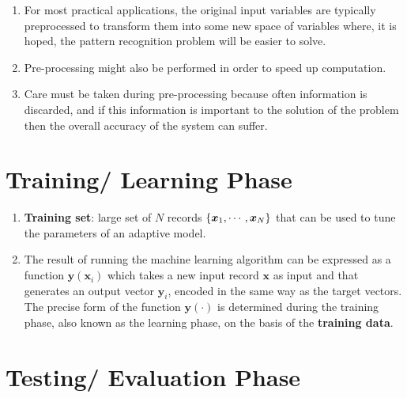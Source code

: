 \begin{enumerate}
    \item For most practical applications, the original input variables are typically preprocessed to transform them into some new space of variables where, it is hoped, the pattern recognition problem will be easier to solve.
    \hfill \cite{ml/book/Pattern-Recognition-And-Machine-Learning/Christopher-M-Bishop}

    \item Pre-processing might also be performed in order to speed up computation.
    \hfill \cite{ml/book/Pattern-Recognition-And-Machine-Learning/Christopher-M-Bishop}

    \item Care must be taken during pre-processing because often information is discarded, and if this information is important to the solution of the problem then the overall accuracy of the system can suffer.
    \hfill \cite{ml/book/Pattern-Recognition-And-Machine-Learning/Christopher-M-Bishop}
\end{enumerate}




\section{Training/ Learning Phase}

\begin{enumerate}
    \item \textbf{Training set}: large set of $N$ records $\left\{\bm{x}_1, \cdots , \bm{x}_N \right\}$ that can be used to tune the parameters of an adaptive model. 
    \hfill \cite{ml/book/Pattern-Recognition-And-Machine-Learning/Christopher-M-Bishop}

    \item The result of running the machine learning algorithm can be expressed as a function $\bm{y}(\bm{x}_i)$ which takes a new input record $\bm{x}$ as input and that generates an output vector $\bm{y}_i$, encoded in the same way as the target vectors.
    The precise form of the function $\bm{y}(\cdot)$ is determined during the training phase, also known as the learning phase, on the basis of the \textbf{training data}.
    \hfill \cite{ml/book/Pattern-Recognition-And-Machine-Learning/Christopher-M-Bishop}
\end{enumerate}



\section{Testing/ Evaluation Phase}

